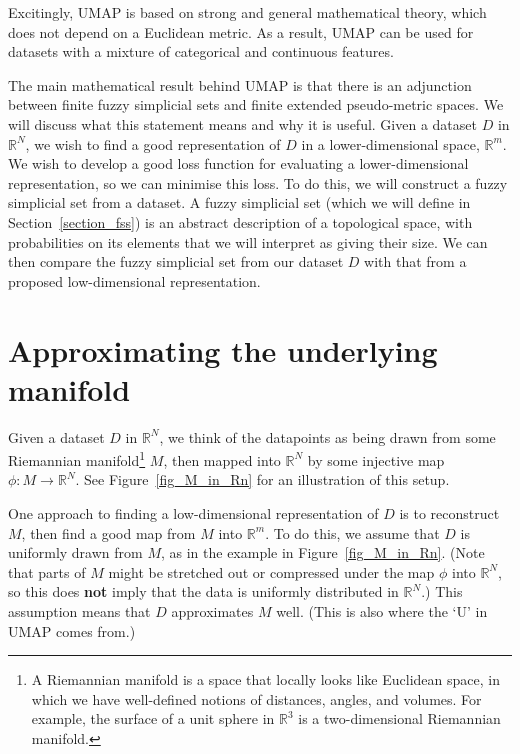 \documentclass[a4paper,12pt,leqno]{article} \usepackage{amsmath}
\newcommand{\RR}{\mathbb{R}} \newcommand{\QQ}{\mathbb{Q}}
\theoremstyle{definition}
\begin{document}
Excitingly, UMAP is based on strong and general mathematical theory, which does
not depend on a Euclidean metric.
As a result, UMAP can be used for datasets with a mixture of categorical and
continuous features.

The main mathematical result behind UMAP is that there is an adjunction between
finite fuzzy simplicial sets and finite extended pseudo-metric spaces.
We will discuss what this statement means and why it is useful.
Given a dataset $D$ in $\RR^N$, we wish to find a good representation of $D$ in
a lower-dimensional space, $\RR^m$.
We wish to develop a good loss function for evaluating a lower-dimensional
representation, so we can minimise this loss.
To do this, we will construct a fuzzy simplicial set from a dataset.
A fuzzy simplicial set (which we will define in Section~\ref{section_fss}) is
an abstract description of a topological space, with probabilities on its
elements that we will interpret as giving their size.
We can then compare the fuzzy simplicial set from our dataset $D$ with that
from a proposed low-dimensional representation.

\section{Approximating the underlying manifold}
\label{section_uniform}

Given a dataset $D$ in $\RR^N$, we think of the datapoints as being drawn from
some Riemannian manifold\footnote{
  A Riemannian manifold is a space that locally looks like Euclidean space, in
  which we have well-defined notions of distances, angles, and volumes.
  For example, the surface of a unit sphere in $\RR^3$ is a two-dimensional
  Riemannian manifold.
} $M$, then mapped into $\RR^N$ by some injective map $\phi: M\to\RR^N$.
See Figure~\ref{fig_M_in_Rn} for an illustration of this setup.

One approach to finding a low-dimensional representation of $D$ is to
reconstruct $M$, then find a good map from $M$ into $\RR^m$.
To do this, we assume that $D$ is uniformly drawn from $M$, as in
the example in Figure~\ref{fig_M_in_Rn}.
(Note that parts of $M$ might be stretched out or compressed under the map
$\phi$ into $\RR^N$, so this does {\textbf{not}} imply that the data is
uniformly distributed in $\RR^N$.)
This assumption means that $D$ approximates $M$ well.
(This is also where the `U' in UMAP comes from.)
\end{document}
